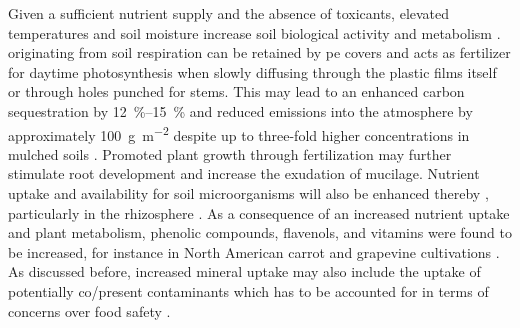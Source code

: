 Given a sufficient nutrient supply and the absence of toxicants, elevated temperatures and soil moisture increase soil biological activity \citep{SubrahmaniyanCrop2006} and metabolism \citep{LiProductivity2004}.  originating from soil respiration can be retained by \ac{pe} covers and acts as fertilizer for daytime photosynthesis when slowly diffusing through the plastic films itself or through holes punched for stems. This may lead to an enhanced carbon sequestration by \SIrange{12}{15}{\percent} \citep{AnCarbon2015} and reduced  emissions into the atmosphere by approximately \SI{100}{\gram\per\square\meter}  despite up to three-fold higher  concentrations in mulched soils \citep{LiCarbon2011}. Promoted plant growth through  fertilization may further stimulate root development and increase the exudation of mucilage. Nutrient uptake and availability for soil microorganisms will also be enhanced thereby \citep{LiuResponse2015,SubrahmaniyanCrop2006}, particularly in the rhizosphere \citep{LinEffect2008,MaulMicrobial2014}. As a consequence of an increased nutrient uptake and plant metabolism, phenolic compounds, flavenols, and vitamins were found to be increased, for instance in North American carrot and grapevine cultivations \citep{AntoniousColor2002,CoventryReflective2005}.
As discussed before, increased mineral uptake may also include the uptake of potentially co\-/present contaminants which has to be accounted for in terms of concerns over food safety \citep{MorenoGrowth2003}.

